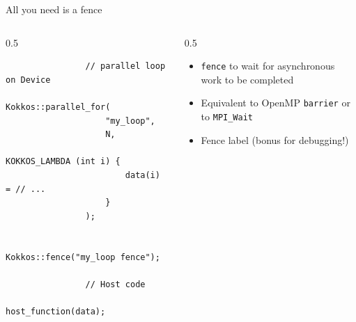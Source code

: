 \documentclass[
    aspectratio=169,
]{beamer}
\begin{document}
\begin{frame}[fragile]{All you need is a fence}
    \begin{columns}
        \begin{column}{0.5\linewidth}
            \begin{verbatim}
                // parallel loop on Device
                Kokkos::parallel_for(
                    "my_loop",
                    N,
                    KOKKOS_LAMBDA (int i) {
                        data(i) = // ...
                    }
                );

                Kokkos::fence("my_loop fence");

                // Host code
                host_function(data);
            \end{verbatim}
        \end{column}
        \begin{column}{0.5\linewidth}
            \begin{itemize}
                \item \texttt{fence} to wait for asynchronous work to be completed
                \item Equivalent to OpenMP \texttt{barrier} or to \texttt{MPI\_Wait}
                \item Fence label (bonus for debugging!)
            \end{itemize}
        \end{column}
    \end{columns}
\end{frame}
\end{document}
